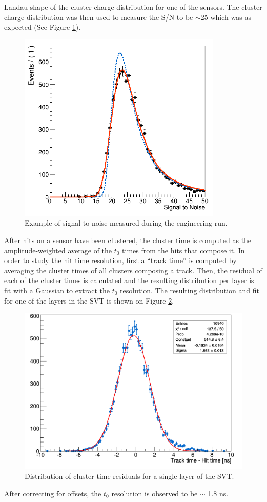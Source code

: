 Landau shape of the cluster charge distribution for one of the sensors.
The cluster charge distribution was then used to measure the S/N to be $\sim$25
which was as expected (See Figure \ref{fig:sig_noise}).
\begin{figure}[h!t]
    \centering
    \includegraphics[width=.7\textwidth]{images/sig_noise.png}
    \caption{Example of signal to noise measured during the engineering run.}
    \label{fig:sig_noise}
\end{figure}  

After hits on a sensor have been
clustered, the cluster time is computed as the amplitude-weighted average
of the $t_0$ times from the hits that compose it.  In order to study the hit
time resolution, first a ``track time'' is computed by averaging the cluster 
times of all clusters composing a track.  Then, the residual of each of the 
cluster times is
calculated and the resulting distribution per layer is fit with a Gaussian
to extract the $t_0$ resolution.  The resulting distribution and fit for 
one of the layers in the SVT is shown on Figure \ref{fig:t0_res}.  
\begin{figure}[h!b]
    \centering
    \includegraphics[width=.7\textwidth]{images/t0_res.png}
    \caption{Distribution of cluster time residuals for a single layer of
    the SVT.}
    \label{fig:t0_res}
\end{figure} 
After correcting for offsets, the $t_{0}$ resolution is observed to be $\sim$ 
1.8 ns.


